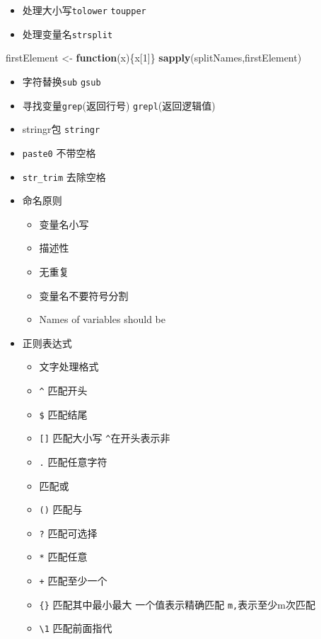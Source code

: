 \documentclass[
]{book}
\newenvironment{Shaded}{\begin{snugshade}}{\end{snugshade}}
\newcommand{\ControlFlowTok}[1]{\textcolor[rgb]{0.13,0.29,0.53}{\textbf{#1}}}
\newcommand{\DecValTok}[1]{\textcolor[rgb]{0.00,0.00,0.81}{#1}}
\newcommand{\KeywordTok}[1]{\textcolor[rgb]{0.13,0.29,0.53}{\textbf{#1}}}
\newcommand{\NormalTok}[1]{#1}
\newcommand{\StringTok}[1]{\textcolor[rgb]{0.31,0.60,0.02}{#1}}
\providecommand{\tightlist}{%
  \setlength{\itemsep}{0pt}\setlength{\parskip}{0pt}}
\begin{document}
\begin{itemize}
\tightlist
\item
  处理大小写\texttt{tolower} \texttt{toupper}
\item
  处理变量名\texttt{strsplit}
\end{itemize}

\begin{Shaded}
\begin{Highlighting}[]
\NormalTok{firstElement <-}\StringTok{ }\ControlFlowTok{function}\NormalTok{(x)\{x[}\DecValTok{1}\NormalTok{]\}}
\KeywordTok{sapply}\NormalTok{(splitNames,firstElement)}
\end{Highlighting}
\end{Shaded}

\begin{itemize}
\tightlist
\item
  字符替换\texttt{sub} \texttt{gsub}
\item
  寻找变量\texttt{grep}(返回行号) \texttt{grepl}(返回逻辑值)
\item
  stringr包 \texttt{stringr}
\item
  \texttt{paste0} 不带空格
\item
  \texttt{str\_trim} 去除空格
\item
  命名原则

  \begin{itemize}
  \tightlist
  \item
    变量名小写
  \item
    描述性
  \item
    无重复
  \item
    变量名不要符号分割
  \item
    Names of variables should be
  \end{itemize}
\item
  正则表达式

  \begin{itemize}
  \tightlist
  \item
    文字处理格式
  \item
    \texttt{\^{}} 匹配开头
  \item
    \texttt{\$} 匹配结尾
  \item
    \texttt{{[}{]}} 匹配大小写 \texttt{\^{}}在开头表示非
  \item
    \texttt{.} 匹配任意字符
  \item
    \texttt{\textbar{}} 匹配或
  \item
    \texttt{()} 匹配与
  \item
    \texttt{?} 匹配可选择
  \item
    \texttt{*} 匹配任意
  \item
    \texttt{+} 匹配至少一个
  \item
    \texttt{\{\}} 匹配其中最小最大 一个值表示精确匹配 \texttt{m,}表示至少m次匹配
  \item
    \texttt{\textbackslash{}1} 匹配前面指代
  \end{itemize}
\end{itemize}
\end{document}
